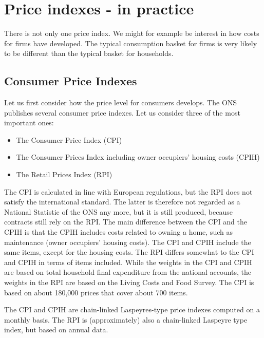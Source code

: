 \documentclass[]{book}
\providecommand{\tightlist}{%
  \setlength{\itemsep}{0pt}\setlength{\parskip}{0pt}}
\begin{document}
\hypertarget{price-indexes---in-practice}{%
\section{Price indexes - in practice}\label{price-indexes---in-practice}}

There is not only one price index. We might for example be interest in how costs for firms have developed. The typical consumption basket for firms is very likely to be different than the typical basket for households.

\hypertarget{consumer-price-indexes}{%
\subsection{Consumer Price Indexes}\label{consumer-price-indexes}}

Let us first consider how the price level for consumers develops. The ONS publishes several consumer price indexes. Let us consider three of the most important ones:

\begin{itemize}
\tightlist
\item
  The Consumer Price Index (CPI)
\item
  The Consumer Prices Index including owner occupiers' housing costs (CPIH)
\item
  The Retail Prices Index (RPI)
\end{itemize}

The CPI is calculated in line with European regulations, but the RPI does not satisfy the international standard. The latter is therefore not regarded as a National Statistic of the ONS any more, but it is still produced, because contracts still rely on the RPI. The main difference between the CPI and the CPIH is that the CPIH includes costs related to owning a home, such as maintenance (owner occupiers' housing costs). The CPI and CPIH include the same items, except for the housing costs. The RPI differs somewhat to the CPI and CPIH in terms of items included. While the weights in the CPI and CPIH are based on total household final expenditure from the national accounts, the weights in the RPI are based on the Living Costs and Food Survey. The CPI is based on about 180,000 prices that cover about 700 items.

The CPI and CPIH are chain-linked Laspeyres-type price indexes computed on a monthly basis. The RPI is (approximately) also a chain-linked Laspeyre type index, but based on annual data.
\end{document}
